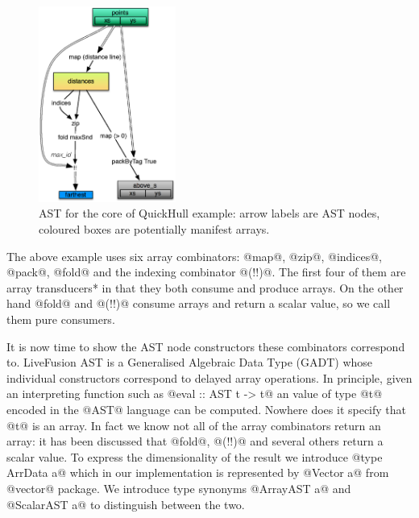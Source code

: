 \documentclass[preamble.tex]{subfiles}
\begin{document}


\begin{figure}
\includegraphics[width=0.4\textwidth,center]{img/QuickHull-flat-but-true}
\caption{\label{fig:QHFlat}{AST for the core of QuickHull example: arrow labels are AST nodes, coloured boxes are potentially manifest arrays.}}
\end{figure}

The above example uses six array combinators: @map@, @zip@, @indices@, @pack@, @fold@ and the indexing combinator @(!!)@. The first four of them are \*array transducers* in that they both consume and produce arrays. On the other hand @fold@ and @(!!)@ consume arrays and return a scalar value, so we call them pure consumers.

It is now time to show the AST node constructors these combinators correspond to. LiveFusion AST is a Generalised Algebraic Data Type (GADT)  whose individual constructors correspond to delayed array operations. In principle, given an interpreting function such as @eval :: AST t -> t@ an value of type @t@ encoded in the @AST@ language can be computed. Nowhere does it specify that @t@ is an array. In fact we know not all of the array combinators return an array: it has been discussed that @fold@, @(!!)@ and several others return a scalar value. To express the dimensionality of the result we introduce @type ArrData a@ which in our implementation is represented by @Vector a@ from @vector@ package. We introduce type synonyms @ArrayAST a@ and @ScalarAST a@ to distinguish between the two.
\end{document}
